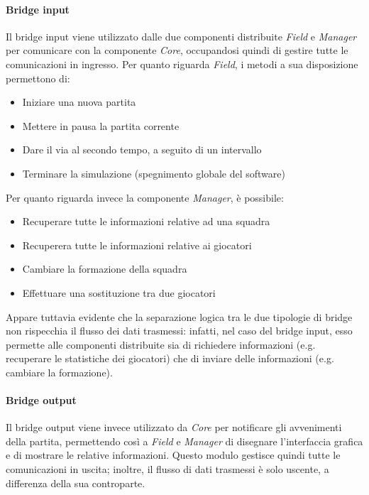 \paragraph{Bridge input}\label{sec:analisi_distribuzione_bridge_input} Il bridge input viene utilizzato dalle due componenti distribuite \textit{Field} e \textit{Manager} per comunicare con la componente \textit{Core}, occupandosi quindi di gestire tutte le comunicazioni in ingresso. Per quanto riguarda \textit{Field}, i metodi a sua disposizione permettono di:

\begin{itemize}
	\item Iniziare una nuova partita
	\item Mettere in pausa la partita corrente
	\item Dare il via al secondo tempo, a seguito di un intervallo
	\item Terminare la simulazione (spegnimento globale del software)
\end{itemize}

\noindent Per quanto riguarda invece la componente \textit{Manager}, è possibile:

\begin{itemize}
	\item Recuperare tutte le informazioni relative ad una squadra
	\item Recuperera tutte le informazioni relative ai giocatori
	\item Cambiare la formazione della squadra
	\item Effettuare una sostituzione tra due giocatori
\end{itemize}

Appare tuttavia evidente che la separazione logica tra le due tipologie di bridge non rispecchia il flusso dei dati trasmessi: infatti, nel caso del bridge input, esso permette alle componenti distribuite sia di richiedere informazioni (e.g. recuperare le statistiche dei giocatori) che di inviare delle informazioni (e.g. cambiare la formazione).\\

\paragraph{Bridge output}\label{sec:analisi_distribuzione_bridge_output} Il bridge output viene invece utilizzato da \textit{Core} per notificare gli avvenimenti della partita, permettendo così a \textit{Field} e \textit{Manager} di disegnare l'interfaccia grafica e di mostrare le relative informazioni. Questo modulo gestisce quindi tutte le comunicazioni in uscita; inoltre, il flusso di dati trasmessi è solo uscente, a differenza della sua controparte.\\

